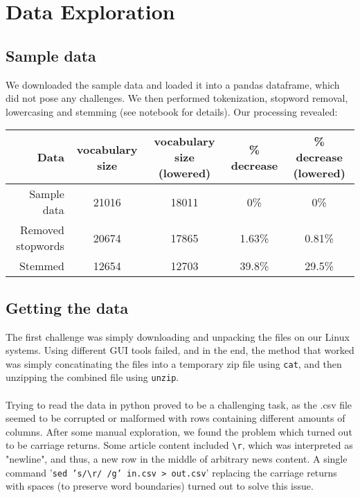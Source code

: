 \section{Data Exploration}
\subsection{Sample data}
We downloaded the sample data and loaded it into a pandas dataframe, which did not pose any challenges. 
We then performed tokenization, stopword removal, lowercasing and stemming (see notebook for details). Our processing revealed:
\begin{table}[h]
    \centering
    \begin{tabular}{r| c | c | c| c}
      Data& vocabulary size & vocabulary size (lowered) & \% decrease & \% decrease (lowered)\\
        \hline
      Sample data& 21016 & 18011 & 0\% & 0\% \\
    \hline
      Removed stopwords & 20674 & 17865 & 1.63\% & 0.81\% \\
    \hline
      Stemmed & 12654 & 12703 & 39.8\% & 29.5\%
    \end{tabular}
\end{table}

\label{sec:headings}
\subsection{Getting the data}
The first challenge was simply downloading and unpacking the files on our Linux systems. Using different GUI tools failed, and in the end, the method that worked was simply concatinating the files into a temporary zip file using \texttt{cat}, and then unzipping the combined file using \texttt{unzip}.\\
\\
Trying to read the data in python proved to be a challenging task, as the .csv file seemed to be corrupted or malformed with rows containing different amounts of columns. After some manual exploration, we found the problem which turned out to be carriage returns. Some article content included \texttt{\textbackslash r}, which was interpreted as "newline", and thus, a new row in the middle of arbitrary news content. A single command '\texttt{sed 's/\textbackslash r/ /g' in.csv > out.csv}' replacing the carriage returns with spaces (to preserve word boundaries) turned out to solve this issue.\\
